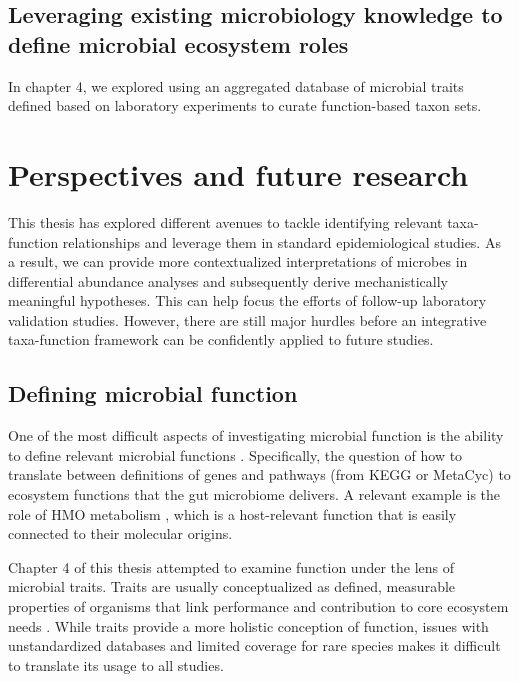 \subsection{Leveraging existing microbiology knowledge to define microbial ecosystem roles}

In chapter 4, we explored using an aggregated database of microbial traits defined based on laboratory experiments to curate function-based taxon sets. 

\section{Perspectives and future research}

This thesis has explored different avenues to tackle identifying relevant taxa-function relationships and leverage them in standard epidemiological studies. As a result, we can provide more contextualized interpretations of microbes in differential abundance analyses and subsequently derive mechanistically meaningful hypotheses. This can help focus the efforts of follow-up laboratory validation studies. However, there are still major hurdles before an integrative taxa-function framework can be confidently applied to future studies. 

\subsection{Defining microbial function}

One of the most difficult aspects of investigating microbial function is the ability to define relevant microbial functions \cite{heintz-buschart2018human, zhang2019advancing, klassen2018defining}. Specifically, the question of how to translate between definitions of genes and pathways (from KEGG or MetaCyc) to ecosystem functions that the gut microbiome delivers. A relevant example is the role of HMO metabolism \cite{vatanen2018human}, which is a host-relevant function that is easily connected to their molecular origins. 

Chapter 4 of this thesis attempted to examine function under the lens of microbial traits. Traits are usually conceptualized as defined, measurable properties of organisms that link performance and contribution to core ecosystem needs \cite{krause2014traitbased}. While traits provide a more holistic conception of function, issues with unstandardized databases \cite{madin2020synthesis} and limited coverage for rare species makes it difficult to translate its usage to all studies. 

